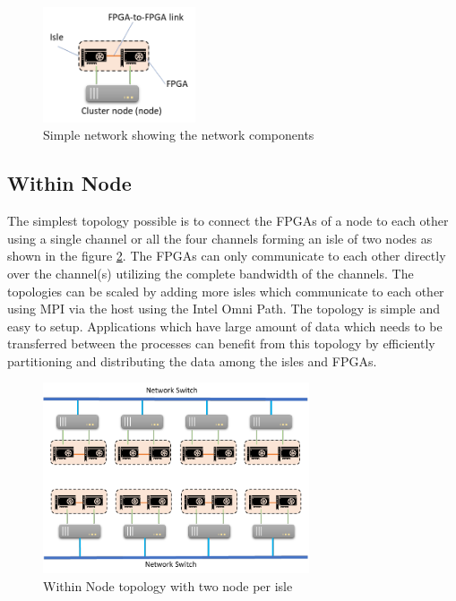 \begin{figure}[h]%
    \centering
    \includegraphics[width=0.4\textwidth]{images/simple_network}
    \caption{Simple network showing the network components}
    \label{fig:simple_network}
\end{figure}


\subsection{Within Node}
\label{sec:within_node}

The simplest topology possible is to connect the FPGAs of a node to each other
using a single channel or all the four channels forming an isle of two nodes as
shown in the figure \ref{fig:within_node}. The FPGAs can only communicate to
each other directly over the channel(s) utilizing the complete bandwidth of the
channels. The topologies can be scaled by adding more isles which communicate
to each other using MPI via the host using the Intel Omni Path. The topology
is simple and easy to setup. Applications which have large amount of data which
needs to be transferred between the processes can benefit from this topology by
efficiently partitioning and distributing the data among the isles and FPGAs.

\begin{figure}[h]%
    \centering
    \includegraphics[width=0.7\textwidth]{images/within_node}
    \caption{Within Node topology with two node per isle}
    \label{fig:within_node}
\end{figure}

